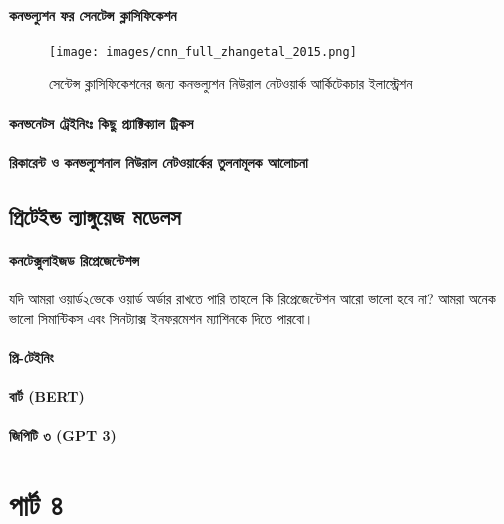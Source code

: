 \documentclass{book}
\begin{document}
\subsection{কনভল্যুশন ফর সেনটেন্স ক্লাসিফিকেশন}

\begin{figure}[htbp] %
   \centering
   \texttt{[image: images/cnn\_full\_zhangetal\_2015.png]} 
   \caption{সেন্টেন্স ক্লাসিফিকেশনের জন্য কনভল্যুশন নিউরাল নেটওয়ার্ক আর্কিটেকচার ইলাস্ট্রেশন}
   \label{fig:cnn_zhangetal} 
\end{figure} 

\subsection{কনভনেটস ট্রেইনিংঃ  কিছু প্র্যাক্টিক্যাল ট্রিকস}

\subsection{রিকারেন্ট ও কনভল্যুশনাল নিউরাল নেটওয়ার্কের তুলনামূলক আলোচনা}

\chapter{প্রিটেইন্ড ল্যাঙ্গুয়েজ মডেলস}
\subsection{কনটেক্সুলাইজড রিপ্রেজেন্টেশন্স}
যদি আমরা ওয়ার্ড২ভেকে ওয়ার্ড অর্ডার রাখতে পারি তাহলে কি রিপ্রেজেন্টেশন আরো ভালো হবে না? আমরা অনেক ভালো সিমান্টিকস এবং সিনট্যাক্স 
ইনফরমেশন ম্যাশিনকে দিতে পারবো। 

\subsection{প্রি-টেইনিং}

\subsection{বার্ট (BERT)}

\subsection{জিপিটি ৩ (GPT 3)}


 \part{পার্ট ৪} 
\end{document}

